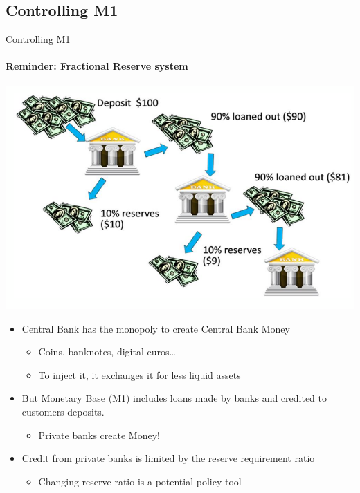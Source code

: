 \documentclass[
  ignorenonframetext,
  aspectratio=169,
]{beamer}
\providecommand{\tightlist}{%
  \setlength{\itemsep}{0pt}\setlength{\parskip}{0pt}}\usepackage{longtable,booktabs,array}
\begin{document}
\subsection{Controlling M1}\label{controlling-m1}

\begin{frame}{Controlling M1}
\framesubtitle{Reminder: Fractional Reserve system}

\includegraphics[width=\textwidth,height=0.2\textheight]{multiplier.png}

\begin{itemize}
\tightlist
\item
  Central Bank has the monopoly to create Central Bank Money

  \begin{itemize}
  \tightlist
  \item
    Coins, banknotes, digital euros\ldots{}
  \item
    To inject it, it exchanges it for less liquid assets
  \end{itemize}
\item
  But Monetary Base (M1) includes loans made by banks and credited to
  customers deposits.

  \begin{itemize}
  \tightlist
  \item
    Private banks create Money!
  \end{itemize}
\item
  Credit from private banks is limited by the reserve requirement ratio

  \begin{itemize}
  \tightlist
  \item
    Changing reserve ratio is a potential policy tool
  \end{itemize}
\end{itemize}
\end{frame}
\end{document}
